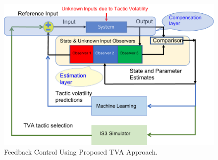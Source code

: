 \documentclass[11pt]{proposalnsf}
\begin{document}
\begin{sloppypar}
 \begin{figure}
 	\centering
     \includegraphics[scale=0.5]{images/tva_control.pdf}
     \caption{Feedback Control Using Proposed TVA Approach.}
     \label{fig:feedbackControl}
 \end{figure}






\end{sloppypar}
\end{document}
